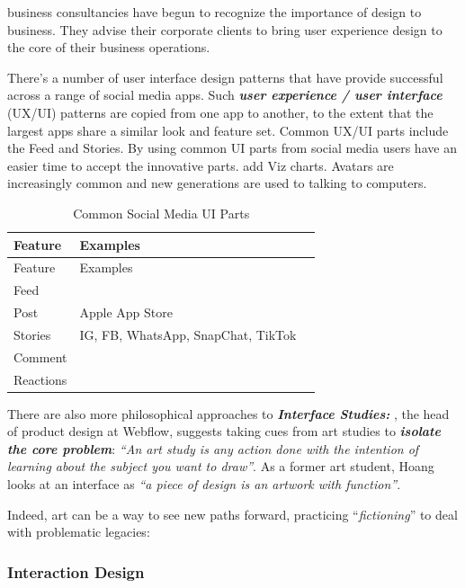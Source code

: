 \documentclass[
  letterpaper,
  DIV=11,
  numbers=noendperiod]{scrartcl}
\begin{document}
\citet{mckeoughMcKinseyDesignLaunches2018} business consultancies have
begun to recognize the importance of design to business. They advise
their corporate clients to bring user experience design to the core of
their business operations.

There's a number of user interface design patterns that have provide
successful across a range of social media apps. Such \textbf{\emph{user
experience / user interface}} (UX/UI) patterns are copied from one app
to another, to the extent that the largest apps share a similar look and
feature set. Common UX/UI parts include the Feed and Stories. By using
common UI parts from social media users have an easier time to accept
the innovative parts. add Viz charts. Avatars are increasingly common
and new generations are used to talking to computers.

\begin{longtable}[]{@{}lll@{}}
\caption{Common Social Media UI Parts}\tabularnewline
\toprule\noalign{}
Feature & Examples & \\
\midrule\noalign{}
\endfirsthead
\toprule\noalign{}
Feature & Examples & \\
\midrule\noalign{}
\endhead
\bottomrule\noalign{}
\endlastfoot
Feed & & \\
Post & Apple App Store & \\
Stories & IG, FB, WhatsApp, SnapChat, TikTok & \\
Comment & & \\
Reactions & & \\
\end{longtable}

There are also more philosophical approaches to \textbf{\emph{Interface
Studies:}} \citet{davidhoangCreatingInterfaceStudies2022}, the head of
product design at Webflow, suggests taking cues from art studies to
\textbf{\emph{isolate the core problem}}: \emph{``An art study is any
action done with the intention of learning about the subject you want to
draw''}. As a former art student, Hoang looks at an interface as
\emph{``a piece of design is an artwork with function''}.

Indeed, art can be a way to see new paths forward, practicing
``\emph{fictioning}'' to deal with problematic legacies:
\citet{Review2023Helsinki2023}

\subsubsection{\texorpdfstring{\textbf{Interaction
Design}}{Interaction Design}}\label{interaction-design}
\end{document}
